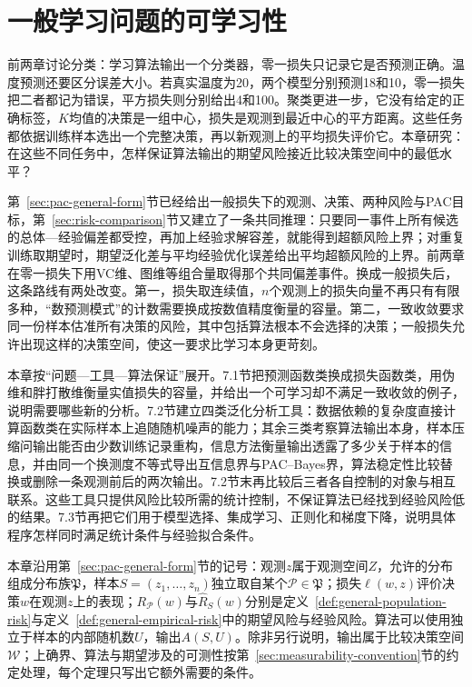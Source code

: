 \chapter{一般学习问题的可学习性}
\label{chap:convex-learning-and-stability}

前两章讨论分类：学习算法输出一个分类器，零一损失只记录它是否预测正确。温度预测还要区分误差大小。若真实温度为20，两个模型分别预测18和10，零一损失把二者都记为错误，平方损失则分别给出4和100。聚类更进一步，它没有给定的正确标签，$K$均值的决策是一组中心，损失是观测到最近中心的平方距离。这些任务都依据训练样本选出一个完整决策，再以新观测上的平均损失评价它。本章研究：在这些不同任务中，怎样保证算法输出的期望风险接近比较决策空间中的最低水平？

第~\ref{sec:pac-general-form}节已经给出一般损失下的观测、决策、两种风险与PAC目标，第~\ref{sec:risk-comparison}节又建立了一条共同推理：只要同一事件上所有候选的总体—经验偏差都受控，再加上经验求解容差，就能得到超额风险上界；对重复训练取期望时，期望泛化差与平均经验优化误差给出平均超额风险的上界。前两章在零一损失下用VC维、图维等组合量取得那个共同偏差事件。换成一般损失后，这条路线有两处改变。第一，损失取连续值，$n$个观测上的损失向量不再只有有限多种，“数预测模式”的计数需要换成按数值精度衡量的容量。第二，一致收敛要求同一份样本估准所有决策的风险，其中包括算法根本不会选择的决策；一般损失允许出现这样的决策空间，使这一要求比学习本身更苛刻。

本章按“问题—工具—算法保证”展开。7.1节把预测函数类换成损失函数类，用伪维和胖打散维衡量实值损失的容量，并给出一个可学习却不满足一致收敛的例子，说明需要哪些新的分析。7.2节建立四类泛化分析工具：数据依赖的复杂度直接计算函数类在实际样本上追随随机噪声的能力；其余三类考察算法输出本身，样本压缩问输出能否由少数训练记录重构，信息方法衡量输出透露了多少关于样本的信息，并由同一个换测度不等式导出互信息界与PAC--Bayes界，算法稳定性比较替换或删除一条观测前后的两次输出。7.2节末再比较后三者各自控制的对象与相互联系。这些工具只提供风险比较所需的统计控制，不保证算法已经找到经验风险低的结果。7.3节再把它们用于模型选择、集成学习、正则化和梯度下降，说明具体程序怎样同时满足统计条件与经验拟合条件。

本章沿用第~\ref{sec:pac-general-form}节的记号：观测$z$属于观测空间$Z$，允许的分布组成分布族$\mathfrak P$，样本$S=(z_1,\ldots,z_n)$独立取自某个$\mathcal P\in\mathfrak P$；损失$\ell(w,z)$评价决策$w$在观测$z$上的表现；$R_{\mathcal P}(w)$与$\hat R_S(w)$分别是定义~\ref{def:general-population-risk}与定义~\ref{def:general-empirical-risk}中的期望风险与经验风险。算法可以使用独立于样本的内部随机数$U$，输出$A(S,U)$。除非另行说明，输出属于比较决策空间$\mathcal W$；上确界、算法与期望涉及的可测性按第~\ref{sec:measurability-convention}节的约定处理，每个定理只写出它额外需要的条件。
